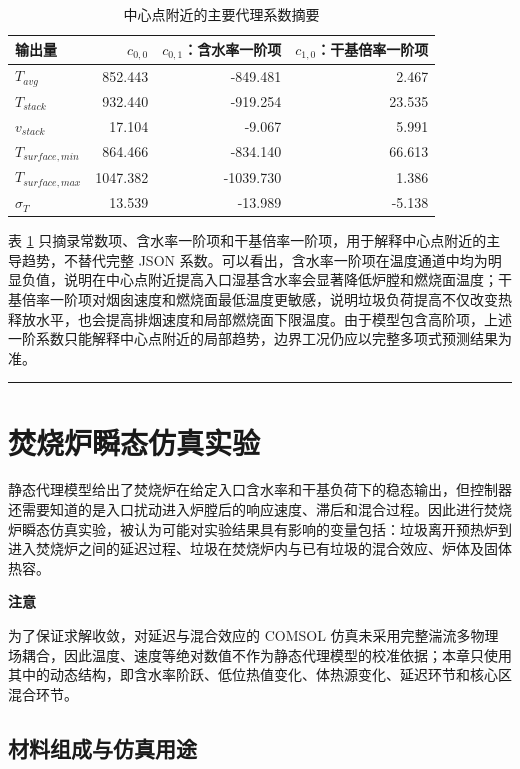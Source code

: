 \documentclass[UTF8,openany,zihao=-4,oneside]{ctexbook}
\newcommand{\manualdivider}{\par\vspace{0.6em}\noindent\textcolor{FGLine}{\rule{\linewidth}{0.7pt}}\vspace{0.6em}\par}
\newcommand{\warnbox}[2]{\begin{tcolorbox}[enhanced,colback=FGOrange!6,colframe=FGOrange!55,boxrule=0.5pt,arc=1.5mm,left=4mm,right=4mm,top=3mm,bottom=3mm]\sffamily\textbf{\color{FGDeep}#1}\par\vspace{0.25em}\color{FGText}#2\end{tcolorbox}}
\begin{document}
\begin{table}[htbp]
\centering\small
\begin{tabular}{lrrr}
\toprule
输出量 & $c_{0,0}$ & $c_{0,1}$：含水率一阶项 & $c_{1,0}$：干基倍率一阶项 \\
\midrule
$T_{avg}$ & 852.443 & -849.481 & 2.467 \\
$T_{stack}$ & 932.440 & -919.254 & 23.535 \\
$v_{stack}$ & 17.104 & -9.067 & 5.991 \\
$T_{surface,min}$ & 864.466 & -834.140 & 66.613 \\
$T_{surface,max}$ & 1047.382 & -1039.730 & 1.386 \\
$\sigma_T$ & 13.539 & -13.989 & -5.138 \\
\bottomrule
\end{tabular}
\caption{中心点附近的主要代理系数摘要}
\label{tab:furnace-surrogate-coeff-main}
\end{table}

表 \ref{tab:furnace-surrogate-coeff-main} 只摘录常数项、含水率一阶项和干基倍率一阶项，用于解释中心点附近的主导趋势，不替代完整 JSON 系数。可以看出，含水率一阶项在温度通道中均为明显负值，说明在中心点附近提高入口湿基含水率会显著降低炉膛和燃烧面温度；干基倍率一阶项对烟囱速度和燃烧面最低温度更敏感，说明垃圾负荷提高不仅改变热释放水平，也会提高排烟速度和局部燃烧面下限温度。由于模型包含高阶项，上述一阶系数只能解释中心点附近的局部趋势，边界工况仍应以完整多项式预测结果为准。

\manualdivider


\chapter{焚烧炉瞬态仿真实验}

静态代理模型给出了焚烧炉在给定入口含水率和干基负荷下的稳态输出，但控制器还需要知道的是入口扰动进入炉膛后的响应速度、滞后和混合过程。因此进行焚烧炉瞬态仿真实验，被认为可能对实验结果具有影响的变量包括：垃圾离开预热炉到进入焚烧炉之间的延迟过程、垃圾在焚烧炉内与已有垃圾的混合效应、炉体及固体热容。

\warnbox{注意}{为了保证求解收敛，对延迟与混合效应的 COMSOL 仿真未采用完整湍流多物理场耦合，因此温度、速度等绝对数值不作为静态代理模型的校准依据；本章只使用其中的动态结构，即含水率阶跃、低位热值变化、体热源变化、延迟环节和核心区混合环节。}

\section{材料组成与仿真用途}
\end{document}

